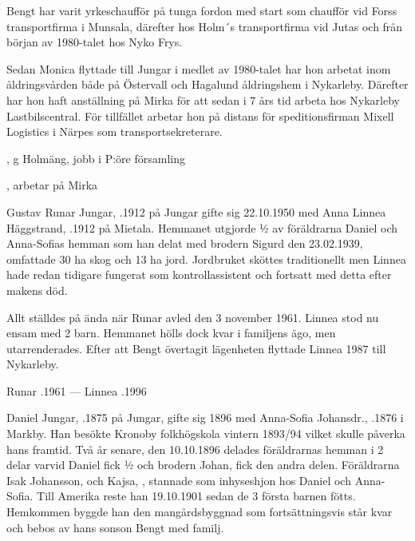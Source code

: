 Bengt har varit yrkeschaufför på tunga fordon med start som chaufför vid Forss transportfirma i Munsala, därefter hos Holm´s transportfirma vid Jutas och från början av 1980-talet hos Nyko Frys.

Sedan Monica flyttade till Jungar i medlet av 1980-talet har hon arbetat inom åldringsvården både på Östervall och Hagalund åldringshem i Nykarleby. Därefter har hon haft anställning på Mirka för att sedan i 7 års tid arbeta hos Nykarleby Lastbilscentral. För tillfället arbetar hon på distans för speditionsfirman Mixell Logistics i Närpes som transportsekreterare.
\begin{jhchildren}
  \item {}, g Holmäng, jobb i P:öre församling
  \item {}, arbetar på Mirka
\end{jhchildren}


Gustav Runar Jungar, .1912 på Jungar gifte sig 22.10.1950 med Anna Linnea Häggstrand, .1912 på Mietala. Hemmanet utgjorde ½ av föräldrarna Daniel och Anna-Sofias hemman som han delat med brodern Sigurd den 23.02.1939, omfattade 30 ha skog och 13 ha jord. Jordbruket sköttes traditionellt men Linnea hade redan tidigare fungerat som kontrollassistent och fortsatt med detta efter makens död.

Allt ställdes på ända när Runar avled den 3 november 1961. Linnea stod nu ensam med 2 barn. Hemmanet hölls dock kvar i familjens ägo, men utarrenderades. Efter att Bengt övertagit lägenheten flyttade Linnea 1987 till Nykarleby.
\begin{jhchildren}
  \item {}
  \item {}
\end{jhchildren}

Runar .1961  ---  Linnea .1996



Daniel Jungar, .1875 på Jungar, gifte sig 1896 med Anna-Sofia Johansdr., .1876 i Markby. Han besökte Kronoby folkhögskola vintern 1893/94 vilket skulle påverka hans framtid. Två år senare, den 10.10.1896 delades föräldrarnas hemman i 2 delar varvid Daniel fick ½ och brodern Johan,  fick den andra delen. Föräldrarna Isak Johansson,  och Kajsa, , stannade som inhyseshjon hos Daniel och Anna-Sofia. Till Amerika reste han 19.10.1901 sedan de 3 första barnen fötts. Hemkommen byggde han den mangårdsbyggnad som fortsättningsvis står kvar och bebos av hans sonson Bengt med familj.

